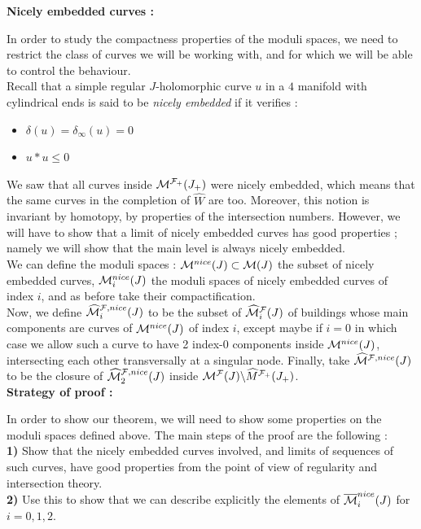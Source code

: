 \documentclass[../main.tex]{subfiles}
\begin{document}
\textbf{Nicely embedded curves :}

In order to study the compactness properties of the moduli spaces, we need to restrict the class of curves we will be working with, and for which we will be able to control the behaviour. \\
Recall that a simple regular $J$-holomorphic curve $u$ in a $4$ manifold with cylindrical ends is said to be \textit{nicely embedded} if it verifies : 
\begin{itemize}
    \item $\delta(u) = \delta_\infty(u) = 0$
    \item $u*u\leq 0$
\end{itemize}
We saw that all curves inside $\mathcal{M}^{\mathcal{F}_+}(J_+)$ were nicely embedded, which means that the same curves in the completion of $\widehat{W}$ are too. Moreover, this notion is invariant by homotopy, by properties of the intersection numbers. However, we will have to show that a limit of nicely embedded curves has good properties ; namely we will show that the main level is always nicely embedded.\\
We can define the moduli spaces : $\mathcal{M}^{nice}(J)\subset\mathcal{M}(J)$ the subset of nicely embedded curves, $\mathcal{M}^{nice}_i(J)$ the moduli spaces of nicely embedded curves of index $i$, and as before take their compactification. \\

Now, we define $\widehat{\mathcal{M}}^{\mathcal{F},nice}_i(J)$ to be the subset of  $\widehat{\mathcal{M}}^{\mathcal{F}}_i(J)$ of buildings whose main components are curves of $\mathcal{M}^{nice}(J)$ of index $i$, except maybe if $i = 0$ in which case we allow such a curve to have 2 index-0 components inside $\mathcal{M}^{nice}(J)$, intersecting each other transversally at a singular node. Finally, take $\widehat{\mathcal{M}}^{\mathcal{F},nice}(J)$ to be the closure of $\widehat{\mathcal{M}}^{\mathcal{F},nice}_2(J)$ inside $\mathcal{M}^{\mathcal{F}}(J)\backslash\widehat{M}^{\mathcal{F}_+}(J_+)$. \\

\textbf{Strategy of proof :}

In order to show our theorem, we will need to show some properties on the moduli spaces defined above.
The main steps of the proof are the following :\\

\textbf{1)} Show that the nicely embedded curves involved, and limits of sequences of such curves, have good properties from the point of view of regularity and intersection theory.\\

\textbf{2)} Use this to show that we can describe explicitly the elements of $\overline{\mathcal{M}}_i^{nice}(J)$ for $i = 0,1,2$. \\
\end{document}
